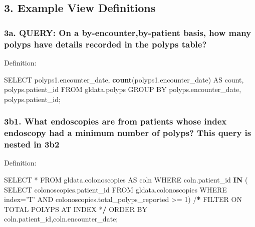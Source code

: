 \documentclass[]{article}
\newenvironment{Shaded}{\begin{snugshade}}{\end{snugshade}}
\newcommand{\KeywordTok}[1]{\textcolor[rgb]{0.13,0.29,0.53}{\textbf{{#1}}}}
\newcommand{\DataTypeTok}[1]{\textcolor[rgb]{0.13,0.29,0.53}{{#1}}}
\newcommand{\DecValTok}[1]{\textcolor[rgb]{0.00,0.00,0.81}{{#1}}}
\newcommand{\StringTok}[1]{\textcolor[rgb]{0.31,0.60,0.02}{{#1}}}
\newcommand{\ErrorTok}[1]{\textcolor[rgb]{0.64,0.00,0.00}{\textbf{{#1}}}}
\newcommand{\NormalTok}[1]{{#1}}
\begin{document}
\subsection{3. Example View Definitions}\label{example-view-definitions}

\subsubsection{3a. QUERY: On a by-encounter,by-patient basis, how many
polyps have details recorded in the polyps
table?}\label{a.-query-on-a-by-encounterby-patient-basis-how-many-polyps-have-details-recorded-in-the-polyps-table}

Definition:

\begin{Shaded}
\begin{Highlighting}[]
\NormalTok{SELECT polyps1.encounter_date,}
    \KeywordTok{count}\NormalTok{(polyps1.encounter_date) AS count,}
    \NormalTok{polyps.patient_id}
   \NormalTok{FROM gldata.polyps}
\NormalTok{GROUP BY polyps.encounter_date, polyps.patient_id;}
\end{Highlighting}
\end{Shaded}

\subsubsection{3b1. What endoscopies are from patients whose index
endoscopy had a minimum number of polyps? This query is nested in
3b2}\label{b1.-what-endoscopies-are-from-patients-whose-index-endoscopy-had-a-minimum-number-of-polyps-this-query-is-nested-in-3b2}

Definition:

\begin{Shaded}
\begin{Highlighting}[]
\NormalTok{SELECT *}
\NormalTok{FROM gldata.colonoscopies AS coln}
\NormalTok{WHERE coln.patient_id }
\KeywordTok{IN} \NormalTok{(    SELECT colonoscopies.patient_id         }
            \NormalTok{FROM gldata.colonoscopies }
            \NormalTok{WHERE }\DataTypeTok{index=}\StringTok{'T'}
            \NormalTok{AND colonoscopies.total_polyps_reported >=}\StringTok{ }\DecValTok{1}\NormalTok{) /}\ErrorTok{*}\StringTok{ }\NormalTok{FILTER ON TOTAL POLYPS AT INDEX *}\ErrorTok{/}
\NormalTok{ORDER BY coln.patient_id,coln.encounter_date;}
\end{Highlighting}
\end{Shaded}
\end{document}
